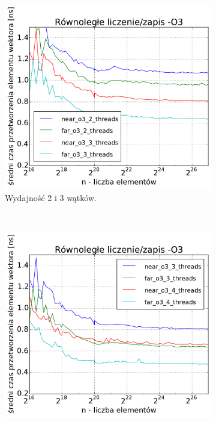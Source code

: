 \begin{figure}[!h]
    \centering
    \begin{subfigure}[c]{0.45\textwidth}
        \centering
        \includegraphics[width=\textwidth]{images/benchs_xeon/parallel_count_interesting1}
        \caption{Wydajność 2 i 3 wątków.}
    \end{subfigure}
    ~
    \begin{subfigure}[c]{0.45\textwidth}
        \centering
        \includegraphics[width=\textwidth]{images/benchs_xeon/parallel_count_interesting2}

\end{subfigure}
\end{figure}
